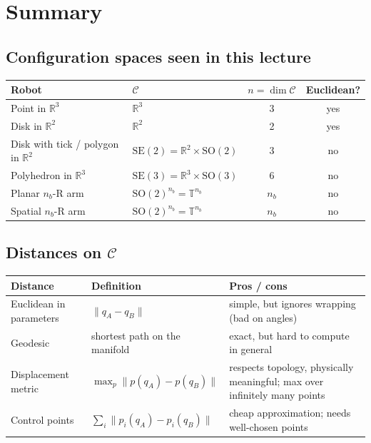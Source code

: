 \documentclass[11pt,a4paper]{article}
\newcommand{\R}{\mathbb{R}}
\newcommand{\C}{\mathcal{C}}
\newcommand{\SO}{\mathrm{SO}}
\newcommand{\SE}{\mathrm{SE}}
\newcommand{\norm}[1]{\lVert #1\rVert}
\theoremstyle{definition}
\theoremstyle{plain}
\begin{document}
\section{Summary}

\subsection{Configuration spaces seen in this lecture}

\begin{center}
\renewcommand{\arraystretch}{1.25}
\begin{tabular}{@{}llcc@{}}
\toprule
Robot & $\C$ & $n=\dim\C$ & Euclidean? \\
\midrule
Point in $\R^3$ & $\R^3$ & 3 & yes \\
Disk in $\R^2$ & $\R^2$ & 2 & yes \\
Disk with tick / polygon in $\R^2$ & $\SE(2)=\R^2\times\SO(2)$ & 3 & no \\
Polyhedron in $\R^3$ & $\SE(3)=\R^3\times\SO(3)$ & 6 & no \\
Planar $n_b$-R arm & $\SO(2)^{n_b}=\mathbb{T}^{n_b}$ & $n_b$ & no \\
Spatial $n_b$-R arm & $\SO(2)^{n_b}=\mathbb{T}^{n_b}$ & $n_b$ & no \\
\bottomrule
\end{tabular}
\end{center}

\subsection{Distances on $\C$}

\begin{center}
\renewcommand{\arraystretch}{1.25}
\begin{tabular}{@{}p{3.3cm}p{4.2cm}p{4.6cm}@{}}
\toprule
Distance & Definition & Pros / cons \\
\midrule
Euclidean in parameters & $\norm{q_A-q_B}$ & simple, but ignores wrapping (bad on angles) \\
Geodesic & shortest path on the manifold & exact, but hard to compute in general \\
Displacement metric & $\max_p\norm{p(q_A)-p(q_B)}$ & respects topology, physically meaningful; max over infinitely many points \\
Control points & $\sum_i\norm{p_i(q_A)-p_i(q_B)}$ & cheap approximation; needs well-chosen points \\
\bottomrule
\end{tabular}
\end{center}
\end{document}
